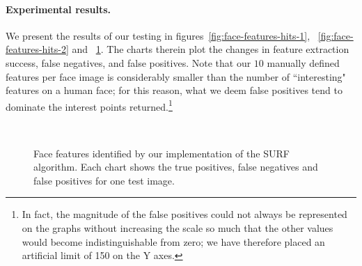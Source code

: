 \paragraph{Experimental results.}
We present the results of our testing in figures~\ref{fig:face-features-hits-1}, ~\ref{fig:face-features-hits-2} and ~\ref{fig:face-features-hits-3}. The charts therein plot the changes in feature extraction success, false negatives, and false positives. Note that our $10$ manually defined features per face image is considerably smaller than the number of ``interesting" features on a human face; for this reason, what we deem false positives tend to dominate the interest points returned.\footnote{ In fact, the magnitude of the false positives could not always be represented on the graphs without increasing the scale so much that the other values would become indistinguishable from zero; we have therefore placed an artificial limit of 150 on the Y axes.}

\begin{figure} [h]
  \centering
  \\
  \caption[Face features identified by our SURF implementation (images 5 \& 6)]{Face features identified by our implementation of the SURF algorithm. Each chart shows the true positives, false negatives and false positives for one test image.}
  \label{fig:face-features-hits-3}
\end{figure}


